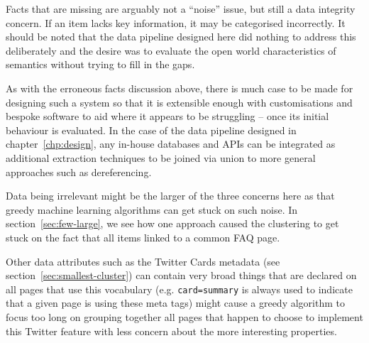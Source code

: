 Facts that are missing are arguably not a ``noise'' issue, but still
a data integrity concern. If an item lacks key information, it may
be categorised incorrectly. It should be noted that the data pipeline
designed here did nothing to address this deliberately and the desire
was to evaluate the open world characteristics of semantics without
trying to fill in the gaps.

As with the erroneous facts discussion above, there is much case to
be made for designing such a system so that it is extensible enough
with customisations and bespoke software to aid where it appears to be
struggling -- once its initial behaviour is evaluated. In the case
of the data pipeline designed in chapter~\ref{chp:design}, any
in-house databases and APIs can be integrated as additional extraction
techniques to be joined via union to more general approaches such
as dereferencing.

Data being irrelevant might be the larger of the three concerns here
as that greedy machine learning algorithms can get stuck on such
noise. In section~\ref{sec:few-large}, we see how one approach
caused the clustering to get stuck on the fact that all items linked
to a common FAQ page.

Other data attributes such as the Twitter
Cards metadata (see section~\ref{sec:smallest-cluster}) can contain
very broad things that are declared on all pages that use this
vocabulary (e.g. \texttt{card=summary} is always used to indicate that
a given page is using these meta tags) might cause a greedy algorithm
to focus too long on grouping together all pages that happen to choose
to implement this Twitter feature with less concern about the more
interesting properties.

